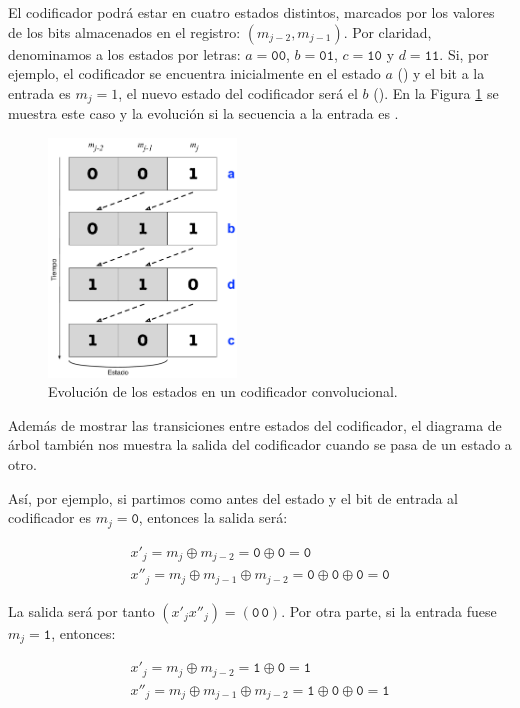 \documentclass[es,apuntes]{uah}
\begin{document}
{El codificador podrá estar en cuatro estados distintos, marcados por los valores de los bits almacenados en el registro: $(m_{j-2}, m_{j-1})$. Por claridad, denominamos a los estados por letras: $a=\mathtt{00}$, $b=\mathtt{01}$, $c=\mathtt{10}$ y $d=\mathtt{11}$. Si, por ejemplo, el codificador se encuentra inicialmente en el estado $a$ () y el bit a la entrada es $m_j = 1$, el nuevo estado del codificador será el $b$ (). En la Figura \ref{fig:ExplicacionEstado} se muestra este caso y la evolución si la secuencia a la entrada es .

\begin{figure}
	\centering\includegraphics[width=5cm]{./Figuras/ExplicacionEstado}
		\caption{Evolución de los estados en un codificador convolucional.}	
	\label{fig:ExplicacionEstado}
\end{figure}

Además de mostrar las transiciones entre estados del codificador, el diagrama de árbol también nos muestra la salida del codificador cuando se pasa de un estado a otro. 

Así, por ejemplo, si partimos como antes del estado  y el bit de entrada al codificador es $m_j = \mathtt{0}$, entonces la salida será:

\begin{displaymath}
\begin{array}{l}
	x'_j = m_j \oplus m_{j-2} = \mathtt{0} \oplus \mathtt{0} = \mathtt{0}\\
	x''_j = m_j \oplus m_{j-1} \oplus m_{j-2} = \mathtt{0} \oplus \mathtt{0} \oplus \mathtt{0} = \mathtt{0}
\end{array}
\end{displaymath}


La salida será por tanto $(x'_j x''_j) = (\mathtt{0\, 0})$. Por otra parte, si la entrada fuese $m_j = \mathtt{1}$, entonces:

\begin{displaymath}
\begin{array}{l}
	x'_j = m_j \oplus m_{j-2} = \mathtt{1} \oplus \mathtt{0} = \mathtt{1} \\
	x''_j = m_j \oplus m_{j-1} \oplus m_{j-2} = \mathtt{1} \oplus \mathtt{0} \oplus \mathtt{0} = \mathtt{1}
\end{array}
\end{displaymath}


}
\end{document}

